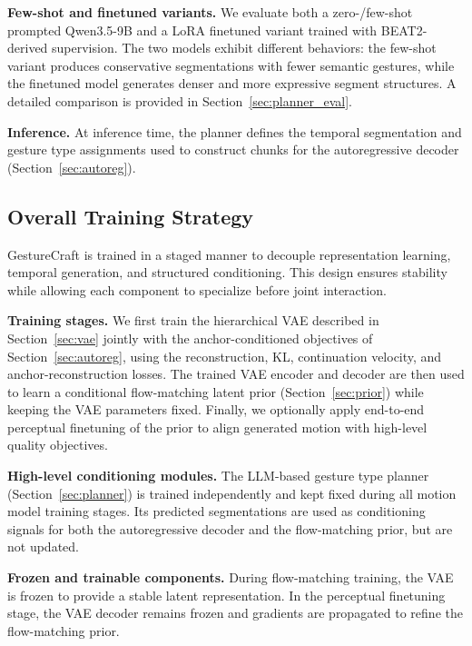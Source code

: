 
\noindent \textbf{Few-shot and finetuned variants.}
We evaluate both a zero-/few-shot prompted Qwen3.5-9B and a LoRA finetuned variant trained with BEAT2-derived supervision.
The two models exhibit different behaviors: the few-shot variant produces conservative segmentations with fewer semantic gestures, while the finetuned model generates denser and more expressive segment structures.
A detailed comparison is provided in Section~\ref{sec:planner_eval}.

\noindent \textbf{Inference.}
At inference time, the planner defines the temporal segmentation and gesture type assignments used to construct chunks for the autoregressive decoder (Section~\ref{sec:autoreg}).

\subsection{Overall Training Strategy}
\label{sec:train}
GestureCraft is trained in a staged manner to decouple representation learning, temporal generation, and structured conditioning.
This design ensures stability while allowing each component to specialize before joint interaction.

\noindent \textbf{Training stages.}
We first train the hierarchical VAE described in Section~\ref{sec:vae} jointly with the anchor-conditioned objectives of Section~\ref{sec:autoreg}, using the reconstruction, KL, continuation velocity, and anchor-reconstruction losses.
The trained VAE encoder and decoder are then used to learn a conditional flow-matching latent prior (Section~\ref{sec:prior}) while keeping the VAE parameters fixed.
Finally, we optionally apply end-to-end perceptual finetuning of the prior to align generated motion with high-level quality objectives.

\noindent \textbf{High-level conditioning modules.}
The LLM-based gesture type planner (Section~\ref{sec:planner}) is trained independently and kept fixed during all motion model training stages.
Its predicted segmentations are used as conditioning signals for both the autoregressive decoder and the flow-matching prior, but are not updated.

\noindent \textbf{Frozen and trainable components.}
During flow-matching training, the VAE is frozen to provide a stable latent representation.
In the perceptual finetuning stage, the VAE decoder remains frozen and gradients are propagated to refine the flow-matching prior.

